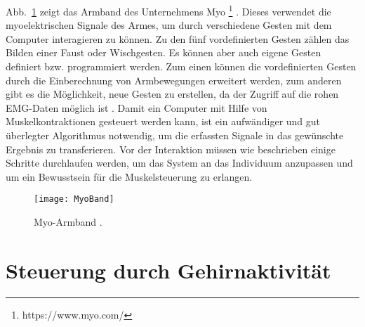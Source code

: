 \newline \newline
Abb.~\ref{fig:MyoBand} zeigt das Armband des Unternehmens Myo%
\footnote{https://www.myo.com/}
%
. Dieses verwendet die myoelektrischen Signale des Armes, um durch verschiedene Gesten mit dem Computer interagieren zu können. Zu den fünf vordefinierten Gesten zählen \zB das Bilden einer Faust oder Wischgesten. Es können aber auch eigene Gesten definiert bzw. programmiert werden. Zum einen können die vordefinierten Gesten durch die Einberechnung von Armbewegungen erweitert werden, zum anderen gibt es die Möglichkeit, neue Gesten zu erstellen, da der Zugriff auf die rohen EMG-Daten möglich ist \cite{myoBand2}.%
\newline \newline
Damit ein Computer mit Hilfe von Muskelkontraktionen gesteuert werden kann, ist ein aufwändiger und gut überlegter Algorithmus notwendig, um die erfassten Signale in das gewünschte Ergebnis zu transferieren. Vor der Interaktion müssen wie beschrieben einige Schritte durchlaufen werden, um das System an das Individuum anzupassen und um ein Bewusstsein für die Muskelsteuerung zu erlangen.
%
%
\begin{figure}
\centering
\texttt{[image: MyoBand]}
\caption{Myo-Armband \cite{myoBand}.}
\label{fig:MyoBand}
\end{figure}
%
%

\section{Steuerung durch Gehirnaktivität}

